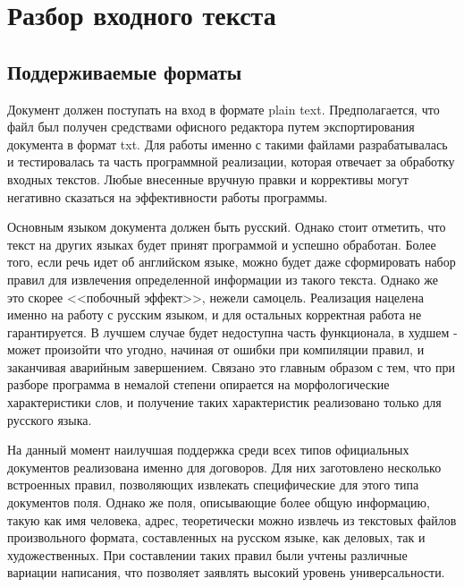 \section{Разбор входного текста}
\subsection{Поддерживаемые форматы}
Документ должен поступать на вход в формате plain text. Предполагается, что файл был получен средствами офисного редактора путем экспортирования документа в формат txt. Для работы именно с такими файлами разрабатывалась и тестировалась та часть программной реализации, которая отвечает за обработку входных текстов. Любые внесенные вручную правки и коррективы могут негативно сказаться на эффективности работы программы.

Основным языком документа должен быть русский. Однако стоит отметить, что текст на других языках будет принят программой и успешно обработан. Более того, если речь идет об английском языке, можно будет даже сформировать набор правил для извлечения определенной информации из такого текста. Однако же это скорее <<побочный эффект>>, нежели самоцель. Реализация нацелена именно на работу с русским языком, и для остальных корректная работа не гарантируется. В лучшем случае будет недоступна часть функционала, в худшем - может произойти что угодно, начиная от ошибки при компиляции правил, и заканчивая аварийным завершением. Связано это главным образом с тем, что при разборе программа в немалой степени опирается на морфологические характеристики слов, и получение таких характеристик реализовано только для русского языка.

На данный момент наилучшая поддержка среди всех типов официальных документов реализована именно для договоров. Для них заготовлено несколько встроенных правил, позволяющих извлекать специфические для этого типа документов поля. Однако же поля, описывающие более общую информацию, такую как имя человека, адрес, теоретически можно извлечь из текстовых файлов произвольного формата, составленных на русском языке, как деловых, так и художественных. При составлении таких правил были учтены различные вариации написания, что позволяет заявлять высокий уровень универсальности.

